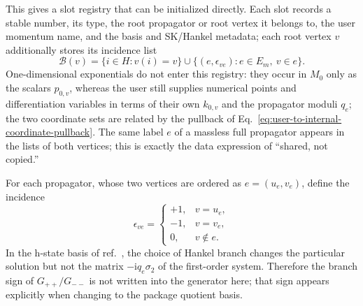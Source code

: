 \documentclass[11pt,a4paper]{article}
\newcommand{\ii}{\mathrm i}
\newcommand{\cB}{\mathcal B}
\begin{document}
This gives a slot registry that can be initialized directly. Each slot records a stable number, its type, the root propagator or root vertex it belongs to, the user momentum name, and the basis and SK/Hankel metadata; each root vertex $v$ additionally stores its incidence list
\begin{equation}
 \cB(v)=
 \{i\in H:v(i)=v\}
 \cup\{(e,\epsilon_{ve}):e\in E_m,\ v\in e\}.
 \label{eq:vertex-block-incidence}
\end{equation}
One-dimensional exponentials do not enter this registry: they occur in $M_0$ only as the scalars $p_{0,v}$, whereas the user still supplies numerical points and differentiation variables in terms of their own $k_{0,v}$ and the propagator moduli $q_e$; the two coordinate sets are related by the pullback of Eq.~\eqref{eq:user-to-internal-coordinate-pullback}. The same label $e$ of a massless full propagator appears in the lists of both vertices; this is exactly the data expression of ``shared, not copied.''

For each propagator, whose two vertices are ordered as $e=(u_e,v_e)$, define the incidence
\begin{equation}
 \epsilon_{ve}=
 \begin{cases}
 +1,&v=u_e,\\
 -1,&v=v_e,\\
 0,&v\notin e.
 \end{cases}
\end{equation}
In the h-state basis of ref.~\cite{Chen:2023eic}, the choice of Hankel branch changes the particular solution but not the matrix $-\ii q_e\sigma_2$ of the first-order system. Therefore the branch sign of $G_{++}/G_{--}$ is not written into the generator here; that sign appears explicitly when changing to the package quotient basis.
\end{document}
